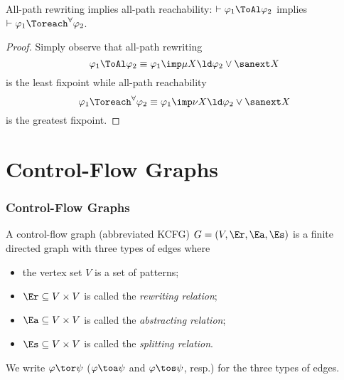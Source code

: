 \begin{frame}
\begin{lemma}
All-path rewriting implies all-path reachability:
$\vdash \varphi_1 \ToAl \varphi_2$ implies
$\vdash \varphi_1 \Toreach^\forall \varphi_2$.
\end{lemma}
\begin{proof}
Simply observe that all-path rewriting
\[\varphi_1 \ToAl \varphi_2 \equiv
       \varphi_1 \imp \mu X \ld \varphi_2 \lor \sanext X\]
is the least fixpoint while
all-path reachability 
\[\varphi_1 \Toreach^\forall \varphi_2 \equiv
       \varphi_1 \imp \nu X \ld \varphi_2 \lor \sanext X\]
is the greatest fixpoint. 
\end{proof}
\end{frame}

\section{\K Control-Flow Graphs}

\begin{frame}
\frametitle{\K Control-Flow Graphs}
\begin{definition}
A \K control-flow graph (abbreviated KCFG) $G = (V, \Er, \Ea, \Es)$ is a finite directed graph
with three types of edges where
\begin{itemize}
\item the vertex set $V$ is a set of patterns;
\item $\Er \subseteq V \times V$ is called the \emph{rewriting relation};
\item $\Ea \subseteq V \times V$ is called the \emph{abstracting relation};
\item $\Es \subseteq V \times V$ is called the \emph{splitting relation}. 
\end{itemize}
We write $\varphi \tor \psi$ 
($\varphi \toa \psi$ and $\varphi \tos \psi$, resp.)
for the three types of edges.
\end{definition}
\end{frame}

